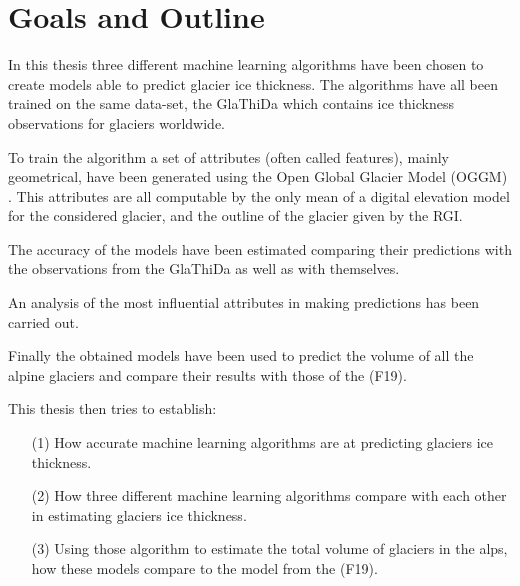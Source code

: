 \section{Goals and Outline}\label{goals}
In this thesis three different machine learning algorithms have been chosen to  create models able to predict glacier ice thickness. The algorithms have all been trained on the same data-set, the GlaThiDa which contains ice thickness observations for glaciers worldwide.

To train the algorithm a set of attributes (often called features), mainly geometrical, have been generated using the Open Global Glacier Model (OGGM) \citep{OGGM2019}. This attributes are all computable by the only mean of a digital elevation model for the considered glacier, and the outline of the glacier given by the RGI.

The accuracy of the models have been estimated comparing their predictions with the observations from the GlaThiDa as well as with themselves.

An analysis of the most influential attributes in making predictions has been carried out.

Finally the obtained models have been used to predict the volume of all the alpine glaciers and compare their results with those of the \citet{Farinotti2019} (F19).


This thesis then tries to establish:
\begin{itemize}
\item[(1)] How accurate machine learning algorithms are at predicting glaciers ice thickness.
\item[(2)] How three different machine learning algorithms compare with each other in estimating glaciers ice thickness.
\item[(3)] Using those algorithm to estimate the total volume of glaciers in the alps, how these models compare to the model from the \cite{Farinotti2019} (F19).
\end{itemize}

%
%
